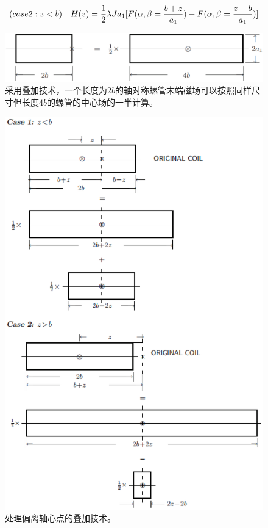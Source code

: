 \begin{equation}
(case 2:z<b)\quad H(z)=\frac{1}{2}\lambda Ja_{1}[F(\alpha,\beta=\frac{b+z}{a_{1}})-F(\alpha,\beta=\frac{z-b}{a_{1}})]\\%
\end{equation}

\begin{figure}
	\centering
	\includegraphics[scale=0.4]{chpt3/figs/fig3.20.eps}
	\caption{采用叠加技术，一个长度为$2b$的轴对称螺管末端磁场可以按照同样尺寸但长度$4b$的螺管的中心场的一半计算。}
\end{figure}

\begin{figure}
	\centering
	\includegraphics[scale=0.7]{chpt3/figs/fig3.21.eps}
	\caption{处理偏离轴心点的叠加技术。}
\end{figure}

